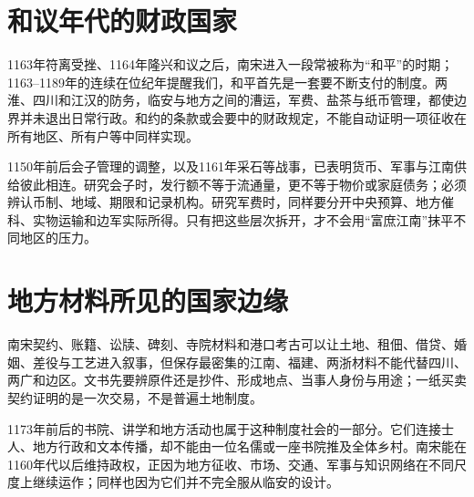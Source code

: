 \section{和议年代的财政国家}

1163年符离受挫、1164年隆兴和议之后，南宋进入一段常被称为“和平”的时期；1163--1189年的连续在位纪年提醒我们，和平首先是一套要不断支付的制度。两淮、四川和江汉的防务，临安与地方之间的漕运，军费、盐茶与纸币管理，都使边界并未退出日常行政。和约的条款或会要中的财政规定，不能自动证明一项征收在所有地区、所有户等中同样实现。

1150年前后会子管理的调整，以及1161年采石等战事，已表明货币、军事与江南供给彼此相连。研究会子时，发行额不等于流通量，更不等于物价或家庭债务；必须辨认币制、地域、期限和记录机构。研究军费时，同样要分开中央预算、地方催科、实物运输和边军实际所得。只有把这些层次拆开，才不会用“富庶江南”抹平不同地区的压力。

\section{地方材料所见的国家边缘}

南宋契约、账籍、讼牍、碑刻、寺院材料和港口考古可以让土地、租佃、借贷、婚姻、差役与工艺进入叙事，但保存最密集的江南、福建、两浙材料不能代替四川、两广和边区。文书先要辨原件还是抄件、形成地点、当事人身份与用途；一纸买卖契约证明的是一次交易，不是普遍土地制度。

1173年前后的书院、讲学和地方活动也属于这种制度社会的一部分。它们连接士人、地方行政和文本传播，却不能由一位名儒或一座书院推及全体乡村。南宋能在1160年代以后维持政权，正因为地方征收、市场、交通、军事与知识网络在不同尺度上继续运作；同样也因为它们并不完全服从临安的设计。
